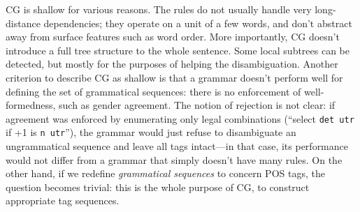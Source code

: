 CG is shallow for various reasons. The rules do not usually handle very
long-distance dependencies; they operate on a unit of a few words, and
don't abstract away from surface features such as word order.
More importantly, CG doesn't introduce a full tree structure to the
whole sentence. Some local subtrees can be detected, but mostly
for the purposes of helping the disambiguation.
Another criterion to describe CG as shallow is that a grammar doesn't
perform well for defining the set of grammatical sequences: there is
no enforcement of well-formedness, such as gender agreement.
The notion of rejection is not clear: if agreement was enforced
by enumerating only legal combinations (``select \texttt{det utr} if
+1 is \texttt{n utr}''), the grammar would just refuse to disambiguate
an ungrammatical sequence and leave all tags intact---in that case,
its performance would not differ from a grammar that simply doesn't have many rules.
On the other hand, if we redefine \emph{grammatical sequences} to concern POS
tags, the question becomes trivial: this is the whole purpose of CG,
to construct appropriate tag sequences.



